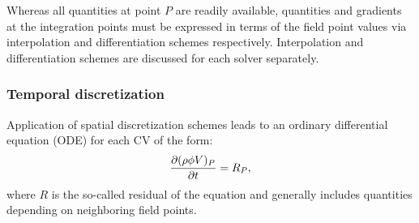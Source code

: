 Whereas all quantities at point $P$ are readily available, quantities and gradients at the integration points must be expressed in terms of the field point values via interpolation and differentiation schemes respectively. Interpolation and differentiation schemes are discussed for each solver separately.

\subsubsection{Temporal discretization}
Application of spatial discretization schemes leads to an ordinary differential equation (ODE) for each CV of the form:
\begin{equation}
     \frac{\partial (\rho\phi V)_P}{\partial t}  = R_P
    \label{eq:temp1},
\end{equation}
where $R$ is the so-called residual of the equation and generally includes quantities depending on neighboring field points.

